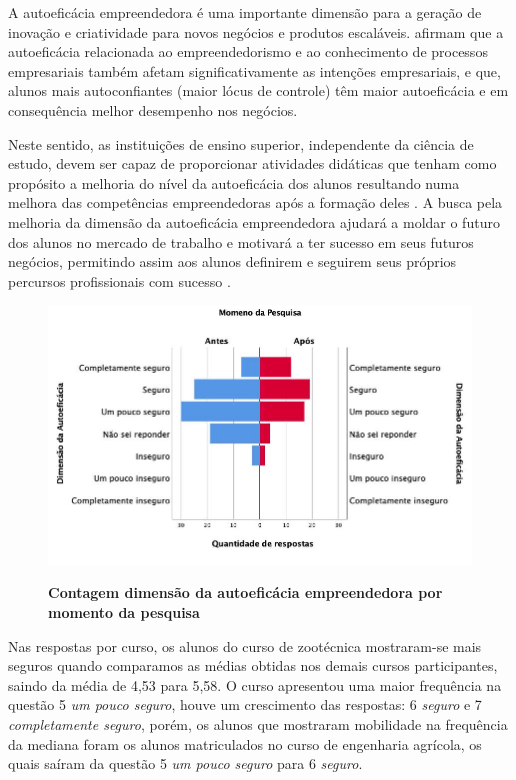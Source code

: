 A autoeficácia empreendedora é uma importante dimensão para a geração de inovação e criatividade para novos negócios e produtos escaláveis.  afirmam que a autoeficácia relacionada ao empreendedorismo e ao conhecimento de processos empresariais também afetam significativamente as intenções empresariais, e que, alunos mais autoconfiantes (maior lócus de controle) têm maior autoeficácia e em consequência melhor desempenho nos negócios.

Neste sentido, as instituições de ensino superior, independente da ciência de estudo, devem ser capaz de proporcionar atividades didáticas que tenham como propósito a melhoria do nível da autoeficácia dos alunos resultando numa melhora das competências empreendedoras após a formação deles \cite{ribeiro_autoeficacia_2019}. A busca pela melhoria da dimensão da autoeficácia empreendedora ajudará a moldar o futuro dos alunos no mercado de trabalho e motivará a ter sucesso em seus futuros negócios, permitindo assim aos alunos definirem e seguirem seus próprios percursos profissionais com sucesso \cite{das_examining_2018}.

\begin{figure}[H]
\centering
\caption{\textbf{
Contagem dimensão da autoeficácia empreendedora  por momento da pesquisa}}
\includegraphics[scale=0.5]{Imagens/dimensao_autoeficacia.jpg}
\label{figura_autoeficacia}
\end{figure}


Nas respostas por curso, os alunos do curso de zootécnica mostraram-se mais seguros quando comparamos as médias obtidas nos demais cursos participantes, saindo da média de 4,53 para 5,58. O curso apresentou uma maior frequência na questão 5 \textit{um pouco seguro}, houve um crescimento das respostas: 6 \textit{seguro} e 7 \textit{completamente seguro}, porém, os alunos que mostraram mobilidade na frequência da mediana foram os alunos matriculados no curso de engenharia agrícola, os quais saíram da questão 5 \textit{um pouco seguro} para 6 \textit{seguro}.


